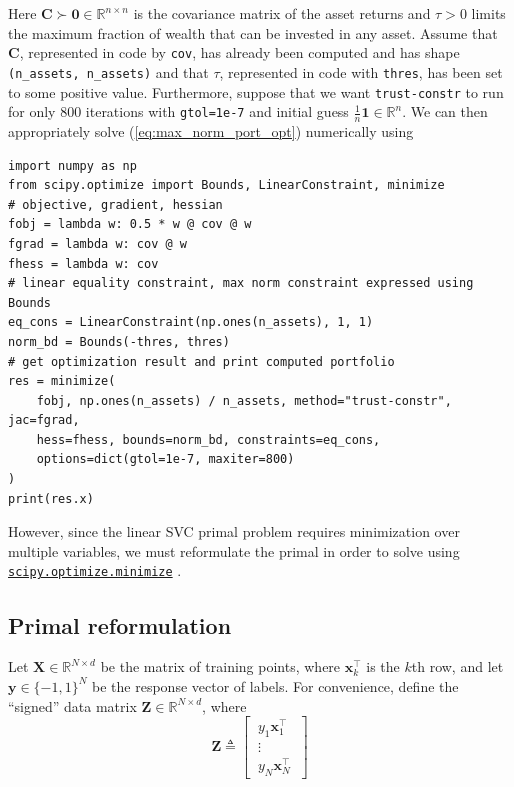 \documentclass{article}
\numberwithin{equation}{section}
\newcommand{\minimize}{%
    \href{%
        https://docs.scipy.org/doc/scipy/reference/generated/%
        scipy.optimize.minimize.html%
    }{\texttt{scipy.optimize.minimize}}%
}
\begin{document}
Here $ \mathbf{C} \succ \mathbf{0} \in \mathbb{R}^{n \times n} $ is the
covariance matrix of the asset returns and $ \tau > 0 $ limits the maximum
fraction of wealth that can be invested in any asset. Assume that
$ \mathbf{C} $, represented in code by \texttt{cov}, has already been
computed and has shape \texttt{(n\_assets, n\_assets)} and that $ \tau $,
represented in code with \texttt{thres}, has been set to some positive value.
Furthermore, suppose that we want \texttt{trust-constr} to run for only 800
iterations with \texttt{gtol=1e-7} and initial guess $ \frac{1}{n}\mathbf{1}
\in \mathbb{R}^n $. We can then appropriately solve
(\ref{eq:max_norm_port_opt}) numerically using

\begin{verbatim}
import numpy as np
from scipy.optimize import Bounds, LinearConstraint, minimize
# objective, gradient, hessian
fobj = lambda w: 0.5 * w @ cov @ w
fgrad = lambda w: cov @ w
fhess = lambda w: cov
# linear equality constraint, max norm constraint expressed using Bounds
eq_cons = LinearConstraint(np.ones(n_assets), 1, 1)
norm_bd = Bounds(-thres, thres)
# get optimization result and print computed portfolio
res = minimize(
    fobj, np.ones(n_assets) / n_assets, method="trust-constr", jac=fgrad,
    hess=fhess, bounds=norm_bd, constraints=eq_cons,
    options=dict(gtol=1e-7, maxiter=800)
)
print(res.x)
\end{verbatim}

However, since the linear SVC primal problem requires minimization over
multiple variables, we must reformulate the primal in order to solve using
\minimize.

\subsection{Primal reformulation}

Let $ \mathbf{X} \in \mathbb{R}^{N \times d} $ be the matrix of training
points, where $ \mathbf{x}_k^\top $ is the $ k $th row, and let
$ \mathbf{y} \in \{-1, 1\}^N $ be the response vector of labels. For
convenience, define the ``signed'' data matrix
$ \mathbf{Z} \in \mathbb{R}^{N \times d} $, where
\begin{equation} \label{eq:signed_X}
    \mathbf{Z} \triangleq \begin{bmatrix}
        \ y_1\mathbf{x}_1^\top \ \\ \ \vdots \ \\ \ y_N\mathbf{x}_N^\top \
    \end{bmatrix}
\end{equation}
\end{document}
